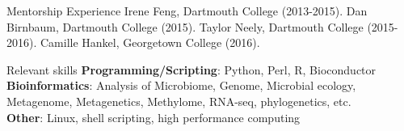 \documentclass{resume} %
\begin{document}


\begin{rSection}{Mentorship Experience}
Irene Feng, Dartmouth College (2013-2015).
Dan Birnbaum, Dartmouth College (2015).
Taylor Neely, Dartmouth College (2015-2016).
Camille Hankel, Georgetown College (2016).
\end{rSection}




\begin{rSection}{Relevant skills}
{\bf Programming/Scripting}: Python, Perl, R, Bioconductor\\
{\bf Bioinformatics}: Analysis of Microbiome, Genome, Microbial ecology, Metagenome, Metagenetics, Methylome, RNA-seq, phylogenetics, etc.\\
{\bf Other}: Linux, shell scripting, high performance computing\\
\end{rSection}







\end{document}
